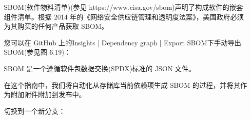 
SBOM(软件物料清单)(参见 https://www.cisa.gov/sbom)声明了构成软件的嵌套组件清单。根据 2014 年的《网络安全供应链管理和透明度法案》，美国政府必须为其购买的任何产品获取 SBOM。

您可以在 GitHub 上的Insights | Dependency graph | Export SBOM下手动导出 SBOM(参见图 6.19)：


SBOM 是一个遵循软件包数据交换(SPDX)标准的 JSON 文件。

在这个指南中，我们将自动化从存储库当前依赖项生成 SBOM 的过程，并将其作为附加附件附加到发布中。


切换到一个新分支：



